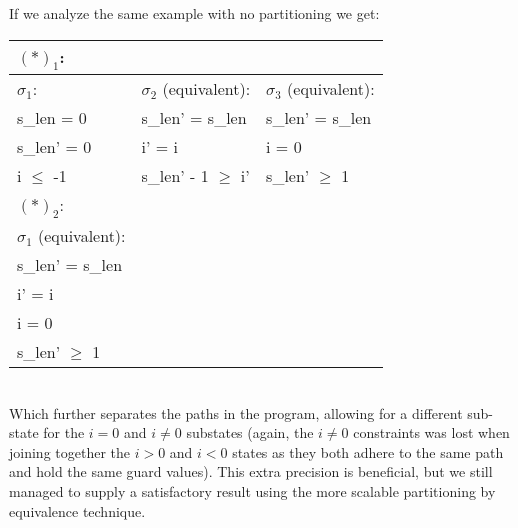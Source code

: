 If we analyze the same example with no partitioning we get:
\\
\begin{tabular}{l|l|l}
$(*)_1$:
\\ \hline
$\sigma_1$:     & $\sigma_2$ (equivalent):  & $\sigma_3$ (equivalent):
\\ \hline
s\_len = 0      & s\_len' = s\_len          & s\_len' = s\_len
\\
s\_len' = 0     & i' = i                    & i = 0
\\
i $\leq$ -1     & s\_len' - 1 $\geq$ i'     & s\_len' $\geq$ 1
\\ \hline
$(*)_2$:
\\ \hline
$\sigma_1$ (equivalent):
\\ \hline
s\_len' = s\_len
\\
i' = i
\\
i = 0
\\
s\_len' $\geq$ 1
\\ \hline
\end{tabular}
\\
Which further separates the paths in the program, allowing for a different sub-state for the $i = 0$ and $i \neq 0$ substates (again, the $i \neq 0$ constraints was lost when joining together the $i > 0$ and $i < 0$ states as they both adhere to the same path and hold the same guard values). This extra precision is beneficial, but we still managed to supply a satisfactory result using the more scalable partitioning by equivalence technique.



